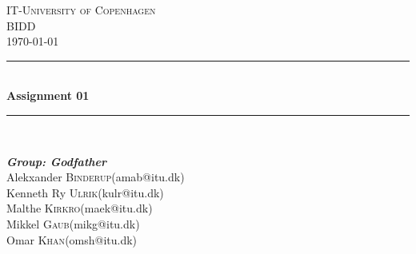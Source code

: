 \begin{titlepage}
\newcommand{\HRule}{\rule{\linewidth}{0.5mm}}

\center

\textsc{\Large IT-University of Copenhagen}\\[1cm]
\textsc{\large BIDD}\\
\textsc{\today}
\HRule\\[0.4cm]
{\huge \bfseries Assignment 01}\\[0.4cm]
\HRule\\[1.5cm]

\begin{minipage}{0.7\textwidth}
\begin{flushleft} \Large
\emph{\textbf{Group: Godfather}}\\
\large
Alekxander \textsc{Binderup}(amab@itu.dk)\\
Kenneth Ry \textsc{Ulrik}(kulr@itu.dk)\\
Malthe \textsc{Kirkro}(maek@itu.dk)\\
Mikkel \textsc{Gaub}(mikg@itu.dk)\\
Omar \textsc{Khan}(omsh@itu.dk)\\
\end{flushleft}
\end{minipage}


\end{titlepage}